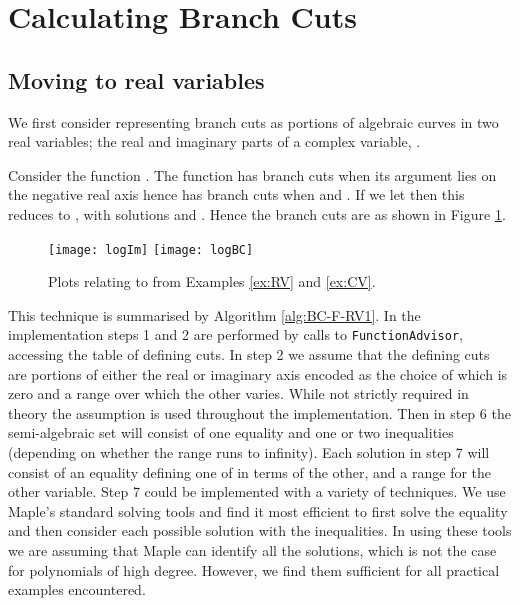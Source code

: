 \documentclass{llncs}
\begin{document}
\section{Calculating Branch Cuts} \label{SEC:Calc}



\subsection{Moving to real variables}

We first consider representing branch cuts as portions of algebraic curves in two real variables; the real and imaginary parts of a complex variable, .  

\begin{example}
\label{ex:RV}
Consider the function .  The function  has branch cuts when its argument lies on the negative real axis hence  has branch cuts when  and .  If we let  then this reduces to 
,   
with solutions  and .  Hence the branch cuts are as shown in Figure \ref{fig:log}.  
\end{example}

\begin{figure}[ht] 
\begin{center}
\texttt{[image: logIm]}
\hspace*{0.3cm}
\texttt{[image: logBC]}
\end{center}
\caption{Plots relating to  from Examples \ref{ex:RV} and \ref{ex:CV}.} 
\label{fig:log}
\end{figure}

This technique is summarised by Algorithm \ref{alg:BC-F-RV1}.  
In the implementation steps 1 and 2 are performed by calls to \texttt{FunctionAdvisor}, accessing the table of defining cuts.  In step 2 we assume that the defining cuts are portions of either the real or imaginary axis encoded as the choice of which is zero and a range over which the other varies.  While not strictly required in theory the assumption is used throughout the implementation.  Then in step 6 the semi-algebraic set will consist of one equality and one or two inequalities (depending on whether the range runs to infinity).  Each solution in step 7 will consist of an equality defining one of  in terms of the other, and a range for the other variable.   Step 7 could be implemented with a variety of techniques.  We use {\sc Maple}'s standard solving tools and find it most efficient to first solve the equality and then consider each possible solution with the inequalities.  In using these tools we are assuming that {\sc Maple} can identify all the solutions, which is not the case for polynomials of high degree.  However, we find them sufficient for all practical examples encountered.
\end{document}
